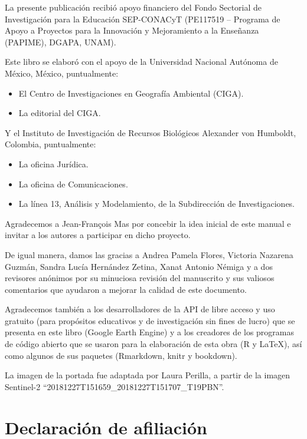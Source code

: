 \documentclass[
  12pt,
  letterpaper,
  twoside]{book}
\providecommand{\tightlist}{%
  \setlength{\itemsep}{0pt}\setlength{\parskip}{0pt}}
\begin{document}
La presente publicación recibió apoyo financiero del Fondo Sectorial de Investigación para la Educación SEP-CONACyT (PE117519 -- Programa de Apoyo a Proyectos para la Innovación y Mejoramiento a la Enseñanza (PAPIME), DGAPA, UNAM).

Este libro se elaboró con el apoyo de la Universidad Nacional Autónoma de México, México, puntualmente:

\begin{itemize}
\tightlist
\item
  El Centro de Investigaciones en Geografía Ambiental (CIGA).
\item
  La editorial del CIGA.
\end{itemize}

Y el Instituto de Investigación de Recursos Biológicos Alexander von Humboldt, Colombia, puntualmente:

\begin{itemize}
\tightlist
\item
  La oficina Jurídica.
\item
  La oficina de Comunicaciones.
\item
  La línea 13, Análisis y Modelamiento, de la Subdirección de Investigaciones.
\end{itemize}

Agradecemos a Jean-François Mas por concebir la idea inicial de este manual e invitar a los autores a participar en dicho proyecto.

De igual manera, damos las gracias a Andrea Pamela Flores, Victoria Nazarena Guzmán, Sandra Lucía Hernández Zetina, Xanat Antonio Némiga y a dos revisores anónimos por su minuciosa revisión del manuscrito y sus valiosos comentarios que ayudaron a mejorar la calidad de este documento.

Agradecemos también a los desarrolladores de la API de libre acceso y uso gratuito (para propósitos educativos y de investigación sin fines de lucro) que se presenta en este libro (Google Earth Engine) y a los creadores de los programas de código abierto que se usaron para la elaboración de esta obra (R y LaTeX), así como algunos de sus paquetes (Rmarkdown, knitr y bookdown).

La imagen de la portada fue adaptada por Laura Perilla, a partir de la imagen Sentinel-2 ``20181227T151659\_20181227T151707\_T19PBN''.

\newpage

\hypertarget{declaraciuxf3n-de-afiliaciuxf3n}{%
\chapter*{Declaración de afiliación}\label{declaraciuxf3n-de-afiliaciuxf3n}}
\end{document}
